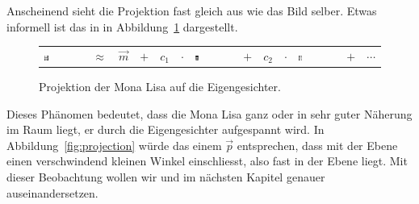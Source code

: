 Anscheinend sieht die Projektion fast gleich aus wie das Bild selber.
Etwas informell ist das in in Abbildung~\ref{fig:eigen_basis} dargestellt.
\begin{figure}[ht]
	\centering
	\begin{tabular}{m{1.8cm} c c c c c m{2cm} c c c m{2cm} c c}
		\includegraphics[width=0.1\textwidth]{images/eigenfaces/mona_lisa_original} &
		$\approx$ & $\vec m$ & $+$ & $c_1$ & $\cdot$ & \includegraphics[width=0.1\textwidth]{images/eigenfaces/eigenface00}
		& $+$ & $c_2$ & $\cdot$ & \includegraphics[width=0.1\textwidth]{images/eigenfaces/eigenface01} & $+$ & $\cdots$
	\end{tabular}
	\caption{Projektion der Mona Lisa auf die Eigengesichter.}
	\label{fig:eigen_basis}
\end{figure}
Dieses Phänomen bedeutet, dass die Mona Lisa ganz oder in sehr guter Näherung im Raum liegt, er durch die Eigengesichter aufgespannt wird.
In Abbildung~\ref{fig:projection} würde das einem $\vec p$ entsprechen, dass mit der Ebene einen verschwindend kleinen Winkel einschliesst, also fast in der Ebene liegt.
Mit dieser Beobachtung wollen wir und im nächsten Kapitel genauer auseinandersetzen.